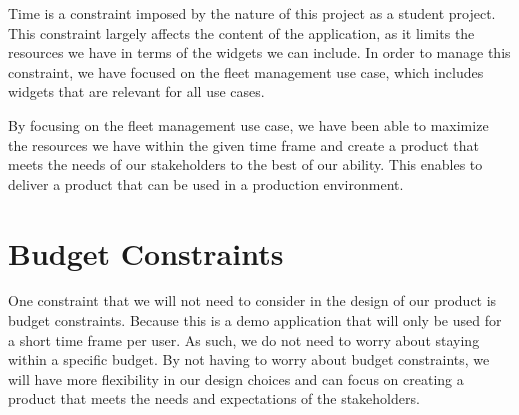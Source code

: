 Time is a constraint imposed by the nature of this project as a student project. This constraint largely affects the content of the application, as it limits the resources we have in terms of the widgets we can include. In order to manage this constraint, we have focused on the fleet management use case, which includes widgets that are relevant for all use cases.

By focusing on the fleet management use case, we have been able to maximize the resources we have within the given time frame and create a product that meets the needs of our stakeholders to the best of our ability. This enables to deliver a product that can be used in a production environment.



\section{Budget Constraints}

One constraint that we will not need to consider in the design of our product is budget constraints. Because this is a demo application that will only be used for a short time frame per user. As such, we do not need to worry about staying within a specific budget. By not having to worry about budget constraints, we will have more flexibility in our design choices and can focus on creating a product that meets the needs and expectations of the stakeholders.